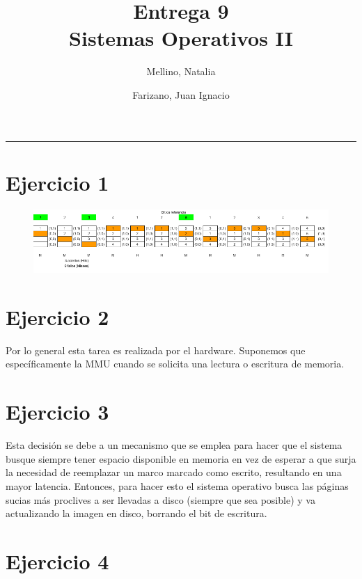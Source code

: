 \documentclass[11pt]{article}
\title{
    Entrega 9 \\
    \large Sistemas Operativos II}
\author{Mellino, Natalia \and Farizano, Juan Ignacio}
\date{}
\begin{document}
\maketitle

\noindent\rule{\textwidth}{1pt}

\section*{Ejercicio 1}

\begin{figure}[h!]
  \begin{center}
    \includegraphics[width=0.99\linewidth]{Paginación.pdf}
  \end{center}
\end{figure}

\section*{Ejercicio 2}

Por lo general esta tarea es realizada por el hardware. Suponemos que específicamente
la MMU cuando se solicita una lectura o escritura de memoria.

\section*{Ejercicio 3}

Esta decisión se debe a un mecanismo que se emplea para hacer que el sistema busque
siempre tener espacio disponible en memoria en vez de esperar a que surja la necesidad
de reemplazar un marco marcado como escrito, resultando en una mayor latencia. Entonces, 
para hacer esto el sistema operativo busca las páginas sucias más proclives a ser 
llevadas a disco (siempre que sea posible) y va actualizando la imagen en disco,
borrando el bit de escritura.

\section*{Ejercicio 4}
\end{document}
